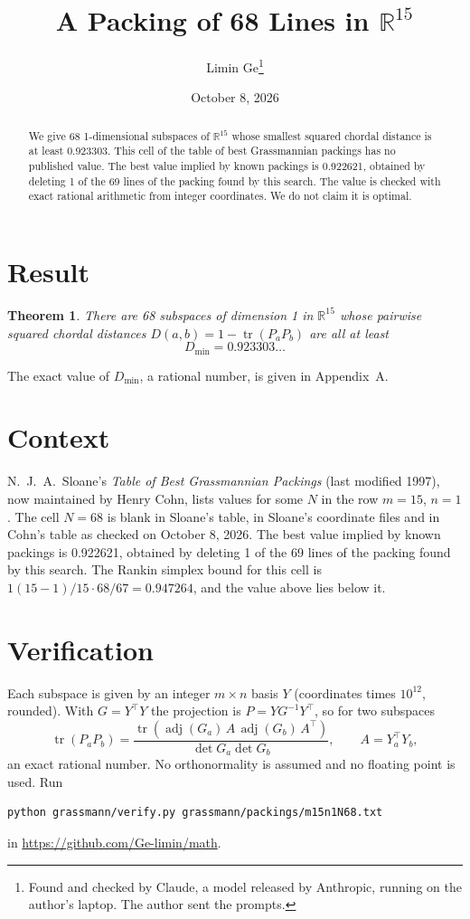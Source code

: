 \documentclass[11pt,a4paper]{article}
\title{A Packing of 68 Lines in $\mathbb{R}^{15}$}
\author{Limin Ge\thanks{Found and checked by Claude, a model released by Anthropic, running on the author's laptop. The author sent the prompts.}}
\date{October 8, 2026}
\newtheorem*{theorem}{Theorem}
\begin{document}
\maketitle
\begin{abstract}
We give 68 1-dimensional subspaces of $\mathbb{R}^{15}$ whose smallest squared chordal distance is at least 0.923303. This cell of the table of best Grassmannian packings has no published value. The best value implied by known packings is 0.922621, obtained by deleting 1 of the 69 lines of the packing found by this search. The value is checked with exact rational arithmetic from integer coordinates. We do not claim it is optimal.
\end{abstract}

\section{Result}
\begin{theorem}
There are 68 subspaces of dimension 1 in $\mathbb{R}^{15}$ whose pairwise squared chordal distances $D(a,b) = 1 - \operatorname{tr}(P_aP_b)$ are all at least
\[ D_{\min} = 0.923303\ldots \]
\end{theorem}
The exact value of $D_{\min}$, a rational number, is given in Appendix~A.


\section{Context}
N.~J.~A.~Sloane's \emph{Table of Best Grassmannian Packings} (last modified 1997), now maintained by Henry Cohn, lists values for some $N$ in the row $m=15$, $n=1$. The cell $N=68$ is blank in Sloane's table, in Sloane's coordinate files and in Cohn's table as checked on October 8, 2026. The best value implied by known packings is 0.922621, obtained by deleting 1 of the 69 lines of the packing found by this search. The Rankin simplex bound for this cell is $1(15-1)/15\cdot 68/67 = 0.947264$, and the value above lies below it.


\section{Verification}
Each subspace is given by an integer $m\times n$ basis $Y$ (coordinates times $10^{12}$, rounded). With $G=Y^\top Y$ the projection is $P=YG^{-1}Y^\top$, so for two subspaces
\[ \operatorname{tr}(P_aP_b)=\frac{\operatorname{tr}(\operatorname{adj}(G_a)\,A\,\operatorname{adj}(G_b)\,A^\top)}{\det G_a\det G_b},\qquad A=Y_a^\top Y_b, \]
an exact rational number. No orthonormality is assumed and no floating point is used. Run
\begin{verbatim}
python grassmann/verify.py grassmann/packings/m15n1N68.txt
\end{verbatim}
in \url{https://github.com/Ge-limin/math}.
\end{document}
